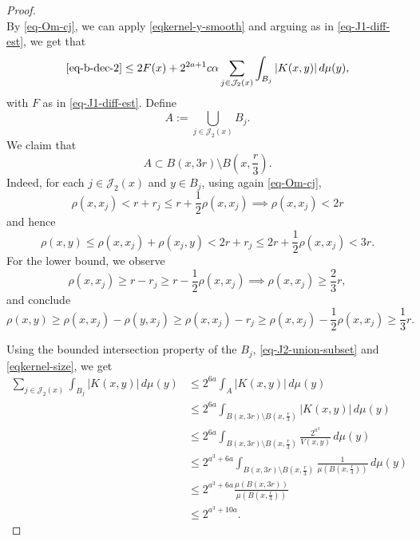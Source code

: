 \begin{proof}
\begin{equation}
\end{equation}
By \eqref{eq-Om-cj}, we can apply \eqref{eqkernel-y-smooth} and arguing as in \eqref{eq-J1-diff-est}, we get that
\begin{equation}
    \label{eq-J2-diff-est-2}
    \eqref{eq-b-dec-2} \le 2F(x) + 2^{2a+1}c\alpha \sum_{j\in\mathcal{J}_2(x)} \int_{B_j}  |K(x,y)|\,d\mu(y),
\end{equation}
with $F$ as in \eqref{eq-J1-diff-est}.
Define
\begin{equation*}
    A := \bigcup_{j \in \mathcal{J}_2(x)} B_j.
\end{equation*}
We claim that
\begin{equation}
    \label{eq-J2-union-subset}
    A\subset B(x,3r) \setminus B(x,\frac{r}{3}).
\end{equation}
Indeed, for each $j\in \mathcal{J}_2(x)$ and $y\in B_j$, using again \eqref{eq-Om-cj},
\begin{equation*}
    \rho(x,x_j) < r+r_j \le r + \frac{1}{2} \rho(x,x_j) \implies \rho(x,x_j) < 2r
\end{equation*}
and hence
\begin{equation*}
    \rho(x,y) \le \rho(x,x_j) + \rho(x_j,y) < 2r + r_j \le 2r + \frac{1}{2}\rho(x,x_j) < 3r.
\end{equation*}
For the lower bound, we observe
\begin{equation*}
    \rho(x,x_j) \ge r-r_j \ge r - \frac{1}{2} \rho(x,x_j) \implies \rho(x,x_j) \ge \frac{2}{3}r,
\end{equation*}
and conclude
\begin{equation*}
    \rho(x,y) \ge \rho(x,x_j) - \rho(y,x_j) \ge \rho(x,x_j) - r_j \ge \rho(x,x_j) - \frac{1}{2}\rho(x,x_j) \ge \frac{1}{3} r.
\end{equation*}

Using the bounded intersection property of the $B_j$, \eqref{eq-J2-union-subset} and \eqref{eqkernel-size}, we get
\begin{align}
    \sum_{j\in\mathcal{J}_2(x)} \int_{B_j}  |K(x,y)|\,d\mu(y) &\le 2^{6a} \int_{A}  |K(x,y)|\,d\mu(y) \\
    &\le 2^{6a} \int_{B(x,3r) \setminus B(x,\frac{r}{3})}  |K(x,y)|\,d\mu(y) \\
    &\le 2^{6a} \int_{B(x,3r) \setminus B(x,\frac{r}{3})} \frac{2^{a^3}}{V(x,y)} \,d\mu(y) \\
    &\le 2^{a^3+6a} \int_{B(x,3r) \setminus B(x,\frac{r}{3})} \frac{1}{\mu(B(x,\frac{r}{3}))} \,d\mu(y) \\
    &\le 2^{a^3+6a} \frac{\mu(B(x,3r))}{\mu(B(x,\frac{r}{3}))} \\
    \label{eq-J2-diff-est-4}
    &\le 2^{a^3+10a}.
\end{align}


\end{proof}
